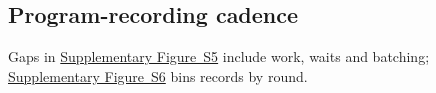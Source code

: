 \subsection{Program-recording cadence}\label{app:program-record-cadence}

Gaps in \href{eurekazero_supplement.pdf#supp-program-record-cadence}{Supplementary Figure~S5} include
work, waits and batching;
\href{eurekazero_supplement.pdf#supp-program-record-windows}{Supplementary Figure~S6} bins records
by round.
